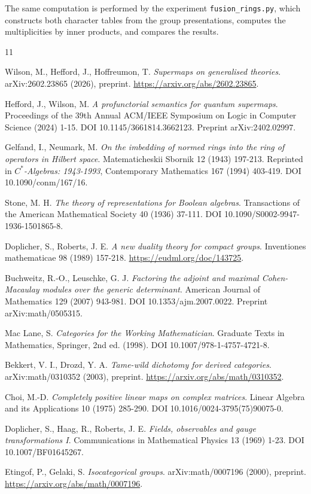 \documentclass[11pt,letterpaper]{article}
\theoremstyle{definition}
\theoremstyle{remark}
\begin{document}
The same computation is performed by the experiment \texttt{fusion\_rings.py}, which constructs both character tables from the group presentations, computes the multiplicities by inner products, and compares the results.

\begin{thebibliography}{11}

Wilson, M., Hefford, J., Hoffreumon, T. \emph{Supermaps on generalised theories}. arXiv:2602.23865 (2026), preprint.
\url{https://arxiv.org/abs/2602.23865}.

Hefford, J., Wilson, M. \emph{A profunctorial semantics for quantum supermaps}. Proceedings of the 39th Annual ACM/IEEE Symposium on Logic in Computer Science (2024) 1-15.
DOI 10.1145/3661814.3662123. Preprint arXiv:2402.02997.

Gelfand, I., Neumark, M. \emph{On the imbedding of normed rings into the ring of operators in Hilbert space}. Matematicheskii Sbornik 12 (1943) 197-213. Reprinted in \emph{$C^*$-Algebras: 1943-1993}, Contemporary Mathematics 167 (1994) 403-419.
DOI 10.1090/conm/167/16.

Stone, M. H. \emph{The theory of representations for Boolean algebras}. Transactions of the American Mathematical Society 40 (1936) 37-111.
DOI 10.1090/S0002-9947-1936-1501865-8.

Doplicher, S., Roberts, J. E. \emph{A new duality theory for compact groups}. Inventiones mathematicae 98 (1989) 157-218.
\url{https://eudml.org/doc/143725}.

Buchweitz, R.-O., Leuschke, G. J. \emph{Factoring the adjoint and maximal Cohen-Macaulay modules over the generic determinant}. American Journal of Mathematics 129 (2007) 943-981.
DOI 10.1353/ajm.2007.0022. Preprint arXiv:math/0505315.

Mac Lane, S. \emph{Categories for the Working Mathematician}. Graduate Texts in Mathematics, Springer, 2nd ed. (1998).
DOI 10.1007/978-1-4757-4721-8.

Bekkert, V. I., Drozd, Y. A. \emph{Tame-wild dichotomy for derived categories}. arXiv:math/0310352 (2003), preprint.
\url{https://arxiv.org/abs/math/0310352}.

Choi, M.-D. \emph{Completely positive linear maps on complex matrices}. Linear Algebra and its Applications 10 (1975) 285-290.
DOI 10.1016/0024-3795(75)90075-0.

Doplicher, S., Haag, R., Roberts, J. E. \emph{Fields, observables and gauge transformations I}. Communications in Mathematical Physics 13 (1969) 1-23.
DOI 10.1007/BF01645267.

Etingof, P., Gelaki, S. \emph{Isocategorical groups}. arXiv:math/0007196 (2000), preprint.
\url{https://arxiv.org/abs/math/0007196}.

\end{thebibliography}
\end{document}
